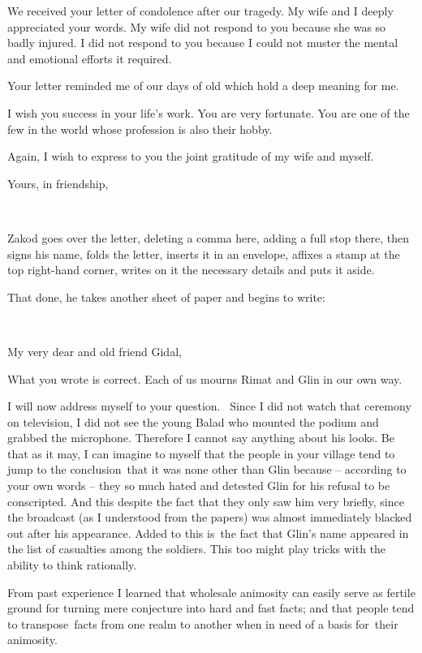 \documentclass[12pt]{book}
\begin{document}
We received your letter of condolence after our tragedy. My wife and I deeply appreciated your words. My wife did not
respond to you because she was so badly injured. I did not respond to you because I could not muster the mental and
emotional efforts it required.

Your letter reminded me of our days of old which hold a deep meaning for me.

I wish you success in your life's work. You are very fortunate. You are one of the few in the world whose profession is
also their hobby.

Again, I wish to express to you the joint gratitude of my wife and myself.

Yours, in friendship,

~

Zakod goes over the letter, deleting a comma here, adding a full stop there, then signs his name, folds the letter,
inserts it in an envelope, affixes a stamp at the top right-hand corner, writes on it the necessary details and puts it
aside.

That done, he takes another sheet of paper and begins to write:

~

My very dear and old friend Gidal,

What you wrote is correct. Each of us mourns Rimat and Glin in our own way.

I will now address myself to your question. ~Since I did not watch that ceremony on television, I did not see the young
Balad who mounted the podium and grabbed the microphone. Therefore I cannot say anything about his looks. Be that as it
may, I can imagine to myself that the people in your village tend to jump to the conclusion~that it was none other than
Glin because -- according to your own words -- they {\textquotedbl}so much hated and detested Glin for his refusal to
be conscripted.{\textquotedbl} And this despite the fact that they only saw him very briefly, since the broadcast (as I
understood from the papers) was almost immediately blacked out after his appearance. Added to this is~the fact that
Glin's name appeared in the list of casualties among the soldiers. This too might play tricks with the ability to think
rationally.

From past experience I learned that wholesale animosity can easily serve as fertile ground for turning mere conjecture
into hard and fast facts; and that people tend to transpose~facts from one realm to another when in need of a basis
for~their animosity.
\end{document}
